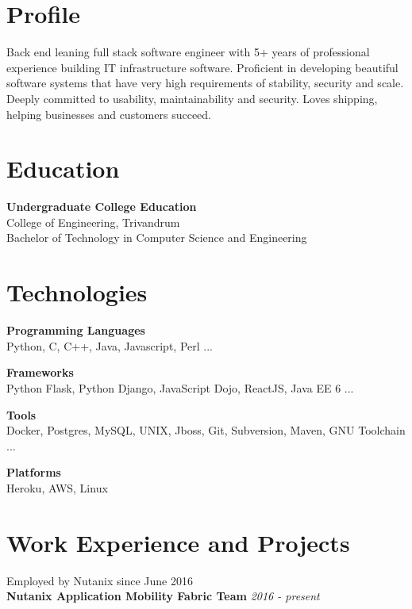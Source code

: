 \documentclass[line,margin]{res}
\begin{document}


\address{joji\_antony@gmx.com}
\address{+91 96323 41954}

\begin{resume}

\section{Profile}
Back end leaning full stack software engineer with 5+ years of professional experience building IT infrastructure software. Proficient in developing beautiful software systems that have very high requirements of stability, security and scale. Deeply committed to usability, maintainability and security. Loves shipping, helping businesses and customers succeed.

\section{Education}
{\bf Undergraduate College Education}\\
College of Engineering, Trivandrum\\
Bachelor of Technology in Computer Science and Engineering\\

\section{Technologies}

{\bf Programming Languages}\\
Python, C, C++, Java, Javascript, Perl ...

{\bf Frameworks}\\
Python Flask, Python Django, JavaScript Dojo, ReactJS, Java EE 6 ...

{\bf Tools}\\
Docker, Postgres, MySQL, UNIX, Jboss, Git, Subversion, Maven, GNU Toolchain ...

{\bf Platforms}\\
Heroku, AWS, Linux

\section{Work Experience and Projects}

Employed by Nutanix since June 2016\\

{\bf Nutanix Application Mobility Fabric Team} \hfill {\it{2016 - present}}\\


\end{resume}
\end{document}
